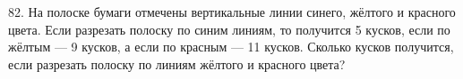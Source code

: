 82. На полоске бумаги отмечены вертикальные линии синего, жёлтого и красного цвета. Если разрезать полоску по синим линиям, то получится 5 кусков, если по жёлтым --- 9 кусков, а если по красным --- 11 кусков. Сколько кусков получится, если разрезать полоску по линиям жёлтого и красного цвета?\\
